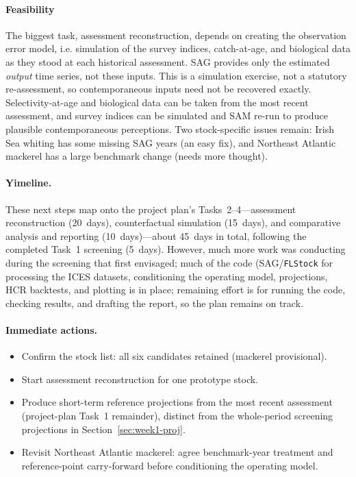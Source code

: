\documentclass[11pt,a4paper]{extarticle}
\begin{document}
\paragraph{Feasibility}
The biggest task, assessment reconstruction, depends on creating the observation error model, i.e. simulation of the survey indices, catch-at-age, and biological data as they stood at each historical assessment. SAG provides only the estimated \emph{output} time series, not these inputs. This is a simulation exercise, not a statutory
re-assessment, so contemporaneous inputs need not be recovered exactly. Selectivity-at-age and biological data can be taken from the most recent assessment, and survey indices can be simulated and SAM re-run to produce plausible
contemporaneous perceptions. Two stock-specific issues remain: Irish Sea whiting has some missing SAG years (an
easy fix), and Northeast Atlantic mackerel has a large benchmark change (needs more thought).

\paragraph{Yimeline.}
These next steps map onto the project plan's Tasks~2--4---assessment reconstruction (20~days), counterfactual simulation (15~days), and comparative analysis and reporting (10~days)---about 45~days in total, following the
completed Task~1 screening (5~days). However, much more work was conducting during the screening that first envisaged; much of the code (SAG/\texttt{FLStock} for processing the ICES datasets, conditioning the operating model, projections, HCR backtests, and plotting is in place; remaining effort is for running the code, checking results, and drafting the report, so the plan remains on track.

\paragraph{Immediate actions.}
\begin{itemize}
  \item Confirm the stock list: all six candidates retained (mackerel provisional).
  \item Start assessment reconstruction for one prototype stock.
  \item Produce short-term reference projections from the most recent assessment
        (project-plan Task~1 remainder), distinct from the whole-period screening
        projections in Section~\ref{sec:week1-proj}.
  \item Revisit Northeast Atlantic mackerel: agree benchmark-year treatment and
        reference-point carry-forward before conditioning the operating model.
\end{itemize}
\end{document}
